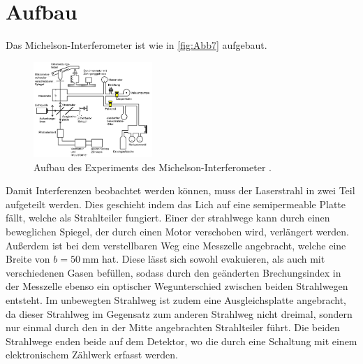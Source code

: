 \section{Aufbau}
\label{sec:Aufbau}

Das Michelson-Interferometer ist wie in \autoref{fig:Abb7} aufgebaut.
\begin{figure}[H]
    \centering
    \includegraphics[width=0.4\textwidth]{build/Abb7.PNG}
    \caption {Aufbau des Experiments des Michelson-Interferometer \cite[3]{V401}.}
    \label{fig:Abb7}
\end{figure}
Damit Interferenzen beobachtet werden können, muss der Laserstrahl in zwei Teil aufgeteilt werden.
Dies geschieht indem das Lich auf eine semipermeable Platte fällt, welche als Strahlteiler fungiert.
Einer der strahlwege kann durch einen beweglichen Spiegel, der durch einen Motor verschoben wird, verlängert werden.
Außerdem ist bei dem verstellbaren Weg eine Messzelle angebracht, welche eine Breite von $b=\qty{50}{\milli\meter}$ hat.
Diese lässt sich sowohl evakuieren, als auch mit verschiedenen Gasen befüllen, sodass durch
den geänderten Brechungsindex in der Messzelle ebenso ein optischer Wegunterschied
zwischen beiden Strahlwegen entsteht.
Im unbewegten Strahlweg ist zudem eine Ausgleichsplatte angebracht, da dieser Strahlweg im
Gegensatz zum anderen Strahlweg nicht dreimal, sondern nur einmal durch den in der
Mitte angebrachten Strahlteiler führt.
Die beiden Strahlwege enden beide auf dem Detektor, wo die durch eine Schaltung mit einem elektronischem Zählwerk erfasst werden.

